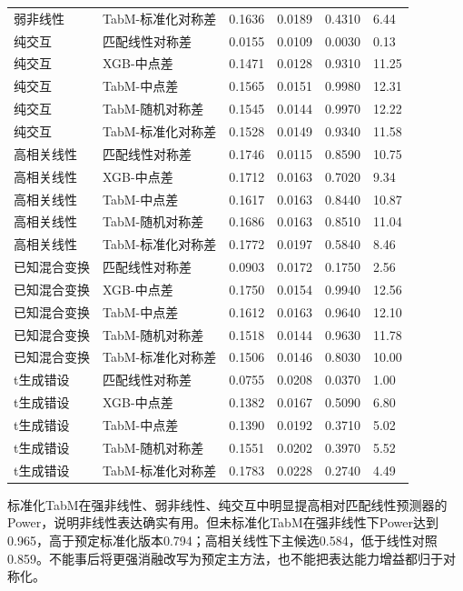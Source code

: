 \documentclass[UTF8,11pt,a4paper]{ctexart}
\begin{document}
{\begin{longtable}[]{@{}llllll@{}}
弱非线性 & TabM-标准化对称差 & 0.1636 & 0.0189 & 0.4310 & 6.44 \\
纯交互 & 匹配线性对称差 & 0.0155 & 0.0109 & 0.0030 & 0.13 \\
纯交互 & XGB-中点差 & 0.1471 & 0.0128 & 0.9310 & 11.25 \\
纯交互 & TabM-中点差 & 0.1565 & 0.0151 & 0.9980 & 12.31 \\
纯交互 & TabM-随机对称差 & 0.1545 & 0.0144 & 0.9970 & 12.22 \\
纯交互 & TabM-标准化对称差 & 0.1528 & 0.0149 & 0.9340 & 11.58 \\
高相关线性 & 匹配线性对称差 & 0.1746 & 0.0115 & 0.8590 & 10.75 \\
高相关线性 & XGB-中点差 & 0.1712 & 0.0163 & 0.7020 & 9.34 \\
高相关线性 & TabM-中点差 & 0.1617 & 0.0163 & 0.8440 & 10.87 \\
高相关线性 & TabM-随机对称差 & 0.1686 & 0.0163 & 0.8510 & 11.04 \\
高相关线性 & TabM-标准化对称差 & 0.1772 & 0.0197 & 0.5840 & 8.46 \\
已知混合变换 & 匹配线性对称差 & 0.0903 & 0.0172 & 0.1750 & 2.56 \\
已知混合变换 & XGB-中点差 & 0.1750 & 0.0154 & 0.9940 & 12.56 \\
已知混合变换 & TabM-中点差 & 0.1612 & 0.0163 & 0.9640 & 12.10 \\
已知混合变换 & TabM-随机对称差 & 0.1518 & 0.0144 & 0.9630 & 11.78 \\
已知混合变换 & TabM-标准化对称差 & 0.1506 & 0.0146 & 0.8030 & 10.00 \\
t生成错设 & 匹配线性对称差 & 0.0755 & 0.0208 & 0.0370 & 1.00 \\
t生成错设 & XGB-中点差 & 0.1382 & 0.0167 & 0.5090 & 6.80 \\
t生成错设 & TabM-中点差 & 0.1390 & 0.0192 & 0.3710 & 5.02 \\
t生成错设 & TabM-随机对称差 & 0.1551 & 0.0202 & 0.3970 & 5.52 \\
t生成错设 & TabM-标准化对称差 & 0.1783 & 0.0228 & 0.2740 & 4.49 \\
\end{longtable}
}

标准化TabM在强非线性、弱非线性、纯交互中明显提高相对匹配线性预测器的Power，说明非线性表达确实有用。但未标准化TabM在强非线性下Power达到0.965，高于预定标准化版本0.794；高相关线性下主候选0.584，低于线性对照0.859。不能事后将更强消融改写为预定主方法，也不能把表达能力增益都归于对称化。
\end{document}
